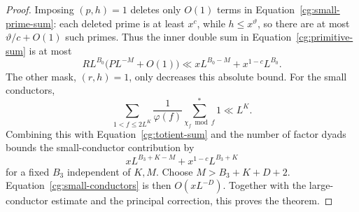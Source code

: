 \begin{proof}
Imposing $(p,h)=1$ deletes only $O(1)$ terms in
Equation~\eqref{cg:small-prime-sum}: each deleted prime is at least
$x^c$, while $h\le x^\vartheta$, so there are at most
$\vartheta/c+O(1)$ such primes. Thus the inner double sum in
Equation~\eqref{cg:primitive-sum} is at most
\[
 RL^{B_0}\bigl(PL^{-M}+O(1)\bigr)
 \ll xL^{B_0-M}+x^{1-c}L^{B_0}.
\]
The other mask, $(r,h)=1$, only decreases this absolute bound.
For the small conductors,
\[
 \sum_{1<f\le2L^K}\frac1{\varphi(f)}
                         \sum_{\chi_f\bmod f}^{*}1\ll L^K.
\]
Combining this with Equation~\eqref{cg:totient-sum} and the number of
factor dyads bounds the small-conductor contribution by
\begin{equation}\label{cg:small-conductors}
 xL^{B_3+K-M}+x^{1-c}L^{B_3+K}
\end{equation}
for a fixed $B_3$ independent of $K,M$. Choose
$M>B_3+K+D+2$. Equation~\eqref{cg:small-conductors} is then
$O(xL^{-D})$. Together with the large-conductor estimate and the
principal correction, this proves the theorem.
\end{proof}
